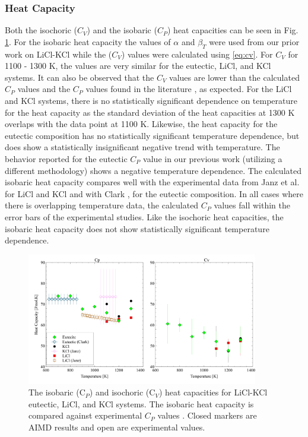 \documentclass[review]{elsarticle}
\begin{document}
\subsubsection{Heat Capacity}
Both the isochoric ($C_V$) and the isobaric ($C_P$) heat capacities can be seen in Fig. \ref{fig:LiCl-KCl cv}. For the isobaric heat capacity the values of \textit{$\alpha$} and \textit{$\beta_T$} were used from our prior work on LiCl-KCl \cite{duemmler_liclkcl} while the ($C_V$) values were calculated using \cref{eq:cv}. For $C_V$ for 1100 - 1300 K, the values are very similar for the eutectic, LiCl, and KCl systems. It can also be observed that the $C_V$ values are lower than the calculated $C_P$ values and the $C_P$ values found in the literature \cite{clark1973heats,janz_osti}, as expected. For the LiCl and KCl systems, there is no statistically significant dependence on temperature for the heat capacity as the standard deviation of the heat capacities at 1300 K overlaps with the data point at 1100 K. Likewise, the heat capacity for the eutectic composition has no statistically significant temperature dependence, but does show a statistically insignificant negative trend with temperature. The behavior reported for the eutectic $C_P$ value in our previous work \cite{duemmler_liclkcl} (utilizing a different methodology) shows a negative temperature dependence. The calculated isobaric heat capacity compares well with the experimental data from Janz et al. \cite{janz_osti} for LiCl and KCl and with Clark \cite{clark1973heats}, for the eutectic composition. In all cases where there is overlapping temperature data, the calculated $C_P$ values fall within the error bars of the experimental studies. Like the isochoric heat capacities, the isobaric heat capacity does not show statistically significant temperature dependence.


\begin{figure}[h]
 \centering
 \includegraphics[width=0.9\textwidth]{cv_licl-kcl.jpg} 
 \caption{The isobaric (C$_P$) and isochoric (C$_V$) heat capacities for LiCl-KCl eutectic, LiCl, and KCl systems. The isobaric heat capacity is compared against experimental $C_P$ values \cite{janz_osti,clark1973heats}. Closed markers are AIMD results and open are experimental values.}

 \label{fig:LiCl-KCl cv}
\end{figure} 
\end{document}
